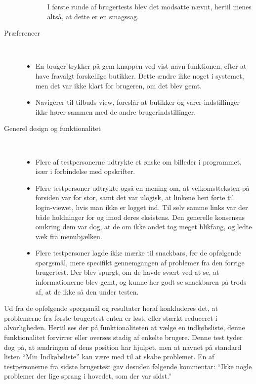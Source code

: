 \begin{description}
\begin{itemize}
\begin{itemize}
         I første runde af brugertests blev det modsatte nævnt, hertil menes altså, at dette er en smagssag.
      \end{itemize} 
   \end{itemize}
   \item[Præferencer]\hfill\\
   \vspace{-15pt}
   \begin{itemize}[nolistsep, noitemsep]
      \item En bruger trykker på gem knappen ved vist navn-funktionen, efter at have fravalgt forskellige butikker.
      Dette ændre ikke noget i systemet, men det var ikke klart for brugeren, om det blev gemt.
      \item Navigerer til tilbuds view, foreslår at butikker og varer-indstillinger ikke hører sammen med de andre brugerindstillinger.
   \end{itemize}
   \item[Generel design og funktionalitet]\hfill\\
   \vspace{-15pt}
   \begin{itemize}[nolistsep, noitemsep]
      \item Flere af testpersonerne udtrykte et ønske om billeder i programmet, især i forbindelse med opskrifter.
      \item Flere testpersoner udtrykte også en mening om, at velkomstteksten på forsiden var for stor, samt det var ulogisk, at linkene heri førte til login-viewet, hvis man ikke er logget ind.
      Til selv samme links var der både holdninger for og imod deres eksistens.
      Den generelle konsensus omkring dem var dog, at de om ikke andet tog meget blikfang, og ledte væk fra menubjælken.
      \item Flere testpersoner lagde ikke mærke til snackbars, før de opfølgende spørgsmål, mere specifikt gennemgangen af problemer fra den forrige brugertest.
      Der blev spurgt, om de havde svært ved at se, at informationerne blev gemt, og kunne her godt se snackbaren på trods af, at de ikke så den under testen.
   \end{itemize}
\end{description}

Ud fra de opfølgende spørgsmål og resultater heraf konkluderes det, at problemerne fra første brugertest enten er løst, eller stærkt reduceret i alvorligheden.
Hertil ses der på funktionaliteten at vælge en indkøbsliste, denne funktionalitet forvirrer eller overses stadig af enkelte brugere. 
Denne test tyder dog på, at ændringen af dens position har hjulpet, men at navnet på standard listen ``Min Indkøbsliste'' kan være med til at skabe problemet.
En af testpersonerne fra sidste brugertest gav desuden følgende kommentar: ``Ikke nogle problemer der lige sprang i hovedet, som der var sidst.''

